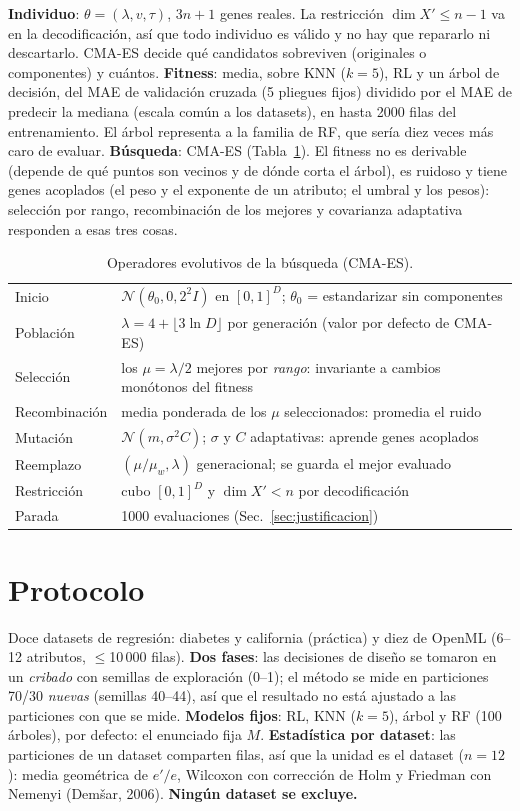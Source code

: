 \documentclass[memoria,twocolumn]{uc3mmaster}
\begin{document}
\textbf{Individuo}: $\theta=(\lambda,v,\tau)$, $3n+1$ genes reales. La restricción $\dim X'\le n-1$ va en la
decodificación, así que todo individuo es válido y no hay que repararlo ni descartarlo. CMA-ES decide qué candidatos
sobreviven (originales o componentes) y cuántos.
\textbf{Fitness}: media, sobre KNN ($k=5$), RL y un árbol de decisión, del MAE de validación cruzada (5 pliegues
fijos) dividido por el MAE de predecir la mediana (escala común a los datasets), en hasta 2000 filas del
entrenamiento. El árbol representa a la familia de RF, que sería diez veces más caro de evaluar.
\textbf{Búsqueda}: CMA-ES (Tabla~\ref{tab:operadores}). El fitness no es derivable (depende de qué puntos son vecinos
y de dónde corta el árbol), es ruidoso y tiene genes acoplados (el peso y el exponente de un atributo; el umbral y los
pesos): selección por rango, recombinación de los mejores y covarianza adaptativa responden a esas tres cosas.

\begin{table}[t]\centering\scriptsize\setlength{\tabcolsep}{2.5pt}
\caption{Operadores evolutivos de la búsqueda (CMA-ES).}
\label{tab:operadores}
\begin{tabular}{@{}p{1.6cm}p{6.4cm}@{}}\toprule
Inicio & $\mathcal N(\theta_0,0{,}2^2I)$ en $[0,1]^D$; $\theta_0$ = estandarizar sin componentes\\
Población & $\lambda=4+\lfloor3\ln D\rfloor$ por generación (valor por defecto de CMA-ES)\\
Selección & los $\mu=\lambda/2$ mejores por \emph{rango}: invariante a cambios monótonos del fitness\\
Recombinación & media ponderada de los $\mu$ seleccionados: promedia el ruido\\
Mutación & $\mathcal N(m,\sigma^2C)$; $\sigma$ y $C$ adaptativas: aprende genes acoplados\\
Reemplazo & $(\mu/\mu_w,\lambda)$ generacional; se guarda el mejor evaluado\\
Restricción & cubo $[0,1]^D$ y $\dim X'<n$ por decodificación\\
Parada & 1000 evaluaciones (Sec.~\ref{sec:justificacion})\\\bottomrule
\end{tabular}
\end{table}

\section{Protocolo}
Doce datasets de regresión: diabetes y california (práctica) y diez de OpenML (6--12 atributos, $\le$10\,000 filas).
\textbf{Dos fases}: las decisiones de diseño se tomaron en un \emph{cribado} con semillas de exploración (0--1); el
método se mide en particiones 70/30 \emph{nuevas} (semillas 40--44), así que el resultado no está ajustado a las
particiones con que se mide. \textbf{Modelos fijos}: RL, KNN ($k=5$), árbol y RF (100 árboles), por defecto: el
enunciado fija $M$. \textbf{Estadística por dataset}: las particiones de un dataset comparten filas, así que la unidad
es el dataset ($n=12$): media geométrica de $e'/e$, Wilcoxon con corrección de Holm y Friedman con Nemenyi (Demšar,
2006). \textbf{Ningún dataset se excluye.}
\end{document}
